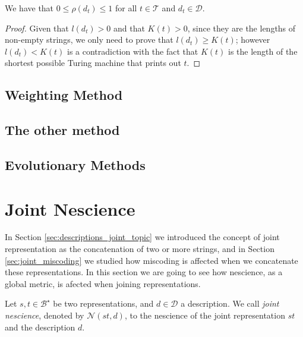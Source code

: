 \begin{proposition}
\label{prop:range_redundancy}
We have that $0 \leq \rho(d_t) \leq 1$ for all $t \in \mathcal{T}$ and $d_t \in \mathcal{D}$.
\end{proposition}
\begin{proof}
Given that $l\left(d_t\right)>0$ and that $K\left(t\right)>0$, since they are the lengths of non-empty strings, we only need to prove that $l\left(d_t\right) \geq K\left(t\right)$; however $l\left(d_t\right) < K\left(t\right)$ is a contradiction with the fact that $K\left(t\right)$ is the length of the shortest possible Turing machine that prints out $t$.
\end{proof}


\subsection{Weighting Method}


\subsection{The other method}


\subsection{Evolutionary Methods}


%
%

\section{Joint Nescience}

In Section \ref{sec:descriptions_joint_topic} we introduced the concept of joint representation as the concatenation of two or more strings, and in Section \ref{sec:joint_miscoding} we studied how miscoding is affected when we concatenate these representations. In this section we are going to see how nescience, as a global metric, is afected when joining representations.

\begin{definition}
Let $s, t \in \mathcal{B}^\star$ be two representations, and $d \in \mathcal{D}$ a description. We call \emph{joint nescience}, denoted by $\mathcal{N} (st, d)$, to the nescience of the joint representation $st$ and the description $d$.
\end{definition}

